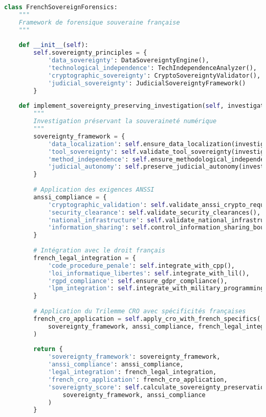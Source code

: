 \begin{lstlisting}[language=Python, caption=Framework français de souveraineté numérique]
class FrenchSovereignForensics:
    """
    Framework de forensique souveraine française
    """
    
    def __init__(self):
        self.sovereignty_principles = {
            'data_sovereignty': DataSovereigntyEngine(),
            'technological_independence': TechIndependenceAnalyzer(),
            'cryptographic_sovereignty': CryptoSovereigntyValidator(),
            'judicial_sovereignty': JudicialSovereigntyFramework()
        }
        
    def implement_sovereignty_preserving_investigation(self, investigation_scope):
        """
        Investigation préservant la souveraineté numérique
        """
        sovereignty_framework = {
            'data_localization': self.ensure_data_localization(investigation_scope),
            'tool_sovereignty': self.validate_tool_sovereignty(investigation_scope),
            'method_independence': self.ensure_methodological_independence(investigation_scope),
            'judicial_autonomy': self.preserve_judicial_autonomy(investigation_scope)
        }
        
        # Application des exigences ANSSI
        anssi_compliance = {
            'cryptographic_validation': self.validate_anssi_crypto_requirements(),
            'security_clearance': self.validate_security_clearances(),
            'national_infrastructure': self.validate_national_infrastructure_usage(),
            'information_sharing': self.control_information_sharing_boundaries()
        }
        
        # Intégration avec le droit français
        french_legal_integration = {
            'code_procedure_penale': self.integrate_with_cpp(),
            'loi_informatique_libertes': self.integrate_with_lil(),
            'rgpd_compliance': self.ensure_gdpr_compliance(),
            'lpm_integration': self.integrate_with_military_programming_law()
        }
        
        # Application du Trilemme CRO avec spécificités françaises
        french_cro_application = self.apply_cro_with_french_specifics(
            sovereignty_framework, anssi_compliance, french_legal_integration
        )
        
        return {
            'sovereignty_framework': sovereignty_framework,
            'anssi_compliance': anssi_compliance,
            'legal_integration': french_legal_integration,
            'french_cro_application': french_cro_application,
            'sovereignty_score': self.calculate_sovereignty_preservation_score(
                sovereignty_framework, anssi_compliance
            )
        }
    

\end{lstlisting}
